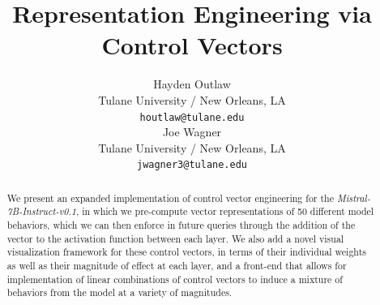 \documentclass[11pt,a4paper]{article}
\title{Representation Engineering via Control Vectors}
\author{Hayden Outlaw \\
  Tulane University / New Orleans, LA \\
  \texttt{houtlaw@tulane.edu} \\\And
  Joe Wagner \\
  Tulane University / New Orleans, LA \\
  \texttt{jwagner3@tulane.edu} \\}
\date{}
\begin{document}
\maketitle
\begin{abstract}
We present an expanded implementation of control vector engineering for the \emph{Mistral-7B-Instruct-v0.1}, in which we pre-compute vector representations of 50 different model behaviors, which we can then enforce in future queries through the addition of the vector to the activation function between each layer. We also add a novel visual visualization framework for these control vectors, in terms of their individual weights as well as their magnitude of effect at each layer, and a front-end that allows for implementation of linear combinations of control vectors to induce a mixture of behaviors from the model at a variety of magnitudes. 
\end{abstract}

%

\end{document}
